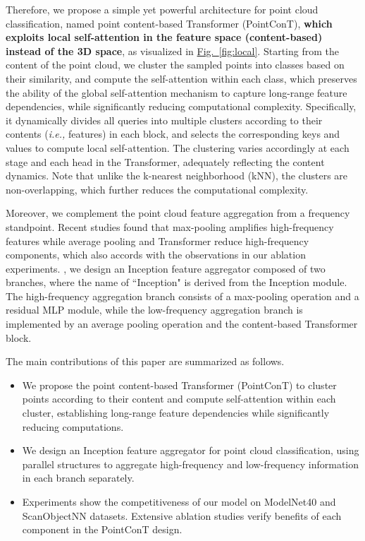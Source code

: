 \documentclass[lettersize,journal]{IEEEtran}
\begin{document}
Therefore, we propose a simple yet powerful architecture for point cloud classification, named point content-based Transformer (PointConT), 
\textbf{which exploits local self-attention in the feature space (content-based) instead of the 3D space}, as visualized in \hyperref[fig:local]{Fig.~\ref*{fig:local}}. 
Starting from the content of the point cloud, we cluster the sampled points into classes based on their similarity, 
and compute the self-attention within each class, which preserves the ability of the 
global self-attention mechanism to capture long-range feature dependencies, while significantly reducing computational complexity.
Specifically, it dynamically divides all queries into multiple clusters according to their contents
(\textit{i.e.,} features) in each block, and selects the corresponding keys and values to compute local self-attention. 
The clustering varies accordingly at each stage and each head in the Transformer, adequately reflecting the content dynamics. 
Note that unlike the k-nearest neighborhood (kNN), the clusters are non-overlapping, which further reduces the computational complexity. 

Moreover, we complement the point cloud feature aggregation from a frequency standpoint. 
Recent studies\cite{visvit,iformer} found that max-pooling amplifies high-frequency features while average pooling and Transformer reduce high-frequency components, 
which also accords with the observations in our ablation experiments.
, we design an Inception feature aggregator composed of two branches, where the name of ``Inception" is derived from the Inception module\cite{inception,inceptionv4}. 
The high-frequency aggregation branch consists of a max-pooling operation and a residual MLP module, 
while the low-frequency aggregation branch is implemented by an average pooling operation and the content-based Transformer block.

The main contributions of this paper are summarized as follows.

\begin{itemize}
  \item We propose the point content-based Transformer (PointConT) to cluster points according to their content and compute self-attention within each cluster, establishing long-range feature dependencies while significantly reducing computations.
  
  \item We design an Inception feature aggregator for point cloud classification, using parallel structures to aggregate high-frequency and low-frequency information in each branch separately.
  
  \item Experiments show the competitiveness of our model on ModelNet40\cite{ModelNet40} and ScanObjectNN\cite{scanobjectnn} datasets. Extensive ablation studies verify benefits of each component in the PointConT design.
\end{itemize}
\end{document}
